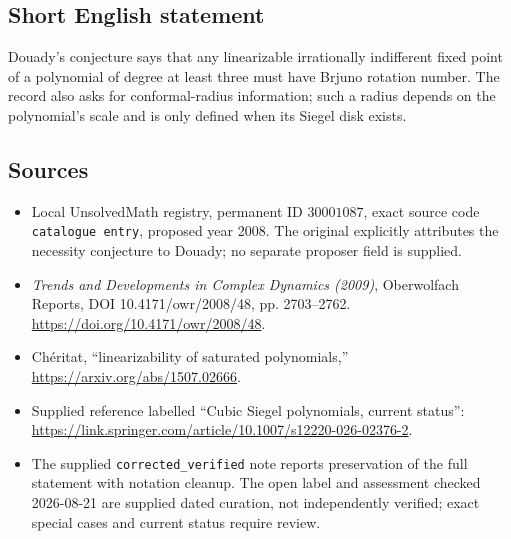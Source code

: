 \documentclass[11pt]{article}
\begin{document}
\subsection{Short English statement}
Douady's conjecture says that any linearizable irrationally indifferent fixed point of a polynomial of degree at least three must have Brjuno rotation number. The record also asks for conformal-radius information; such a radius depends on the polynomial's scale and is only defined when its Siegel disk exists.
\subsection{Sources}
\begin{itemize}
\item Local UnsolvedMath registry, permanent ID \(30001087\), exact source code \texttt{catalogue entry}, proposed year 2008. The original explicitly attributes the necessity conjecture to Douady; no separate proposer field is supplied.
\item \emph{Trends and Developments in Complex Dynamics (2009)}, Oberwolfach Reports, DOI 10.4171/owr/2008/48, pp. 2703--2762. \url{https://doi.org/10.4171/owr/2008/48}.
\item Ch\'eritat, ``linearizability of saturated polynomials,'' \url{https://arxiv.org/abs/1507.02666}.
\item Supplied reference labelled ``Cubic Siegel polynomials, current status'': \url{https://link.springer.com/article/10.1007/s12220-026-02376-2}.
\item The supplied \texttt{corrected\_verified} note reports preservation of the full statement with notation cleanup. The open label and assessment checked 2026-08-21 are supplied dated curation, not independently verified; exact special cases and current status require review.
\end{itemize}
\end{document}
